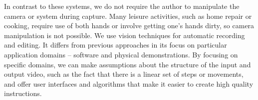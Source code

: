 In contrast to these systems, we do not require the author to manipulate the camera or system during capture. Many leisure activities, such as home repair or cooking, require use of both hands or involve getting one's hands dirty, so camera manipulation is not possible. We use vision techniques for automatic recording and editing. It differs from previous approaches in its focus on particular application domains -- software and physical demonstrations. By focusing on specific domains, we can make assumptions about the structure of the input and output video, such as the fact that there is a linear set of steps or movements, and offer user interfaces and algorithms that make it easier to create high quality instructions.
